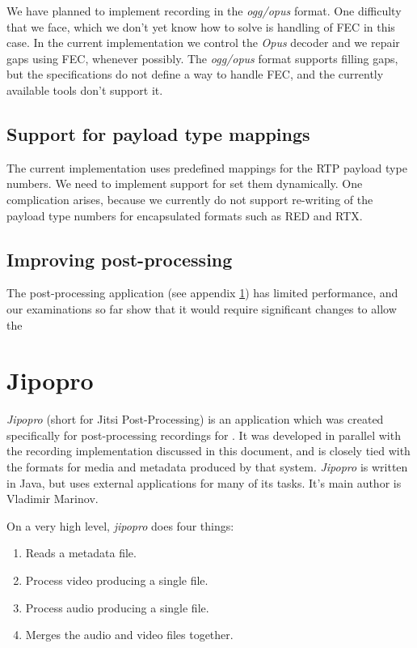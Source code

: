 \documentclass[twoside,openright,a4paper,12pt,english]{article}
\begin{document}
We have planned to implement recording in the \emph{ogg/opus} format. One difficulty
that we face, which we don't yet know how to solve is handling of FEC in this
case. In the current implementation we control the \emph{Opus} decoder and we
repair gaps using FEC, whenever possibly. The \emph{ogg/opus} format supports
filling gaps, but the specifications\cite{ogg,ogg-opus} do not define a way to
handle FEC, and the currently available tools don't support it.

\subsection{Support for payload type mappings}
The current implementation uses predefined mappings for the RTP payload type
numbers. We need to implement support for set them dynamically. One complication arises,
because we currently do not support re-writing of the payload type numbers for encapsulated
formats such as RED and RTX.

\subsection{Improving post-processing}
The post-processing application (see appendix \ref{jipopro}) has limited performance, and
our examinations so far show that it would require significant changes to allow the 





\clearpage
\appendix
\section{Jipopro}
\label{jipopro}
\emph{Jipopro} (short for Jitsi Post-Processing) is an application which was created
specifically for post-processing recordings for \jm. It was developed in parallel with
the recording implementation discussed in this document, and is closely tied
with the formats for media and metadata produced by that system. \emph{Jipopro}
is written in Java, but uses external applications for many of its tasks. It's
main author is Vladimir Marinov.

On a very high level, \emph{jipopro} does four things:
\begin{enumerate}
\item Reads a metadata file.
\item Process video producing a single file.
\item Process audio producing a single file.
\item Merges the audio and video files together.
\end{enumerate}
\end{document}
